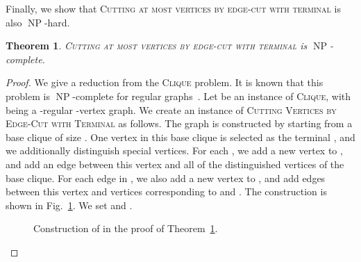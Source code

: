 \documentclass[a4paper,11pt]{article}
\newtheorem{theorem}{Theorem}
\theoremstyle{definition}
\theoremstyle{remark}
\DeclareMathOperator{\operatorClassNP}{NP}
\newcommand{\classNP}{\ensuremath{\operatorClassNP}}
\begin{document}
Finally, we show that \textsc{Cutting at most   vertices by edge-cut with terminal} is also \classNP-hard.

\begin{theorem}\label{thm:sec_terminal_np}
\textsc{Cutting at most   vertices by edge-cut with terminal} is \classNP-complete.
\end{theorem}

\begin{proof}
We give a reduction from the \textsc{Clique} problem. It is known that this problem is \classNP-complete for regular graphs~\cite{GareyJ79}. Let  be an instance of \textsc{Clique}, with  being a -regular -vertex graph. We create an instance  of \textsc{Cutting  Vertices by Edge-Cut with Terminal} as follows. The graph  is constructed by starting from a base clique of size . One vertex in this base clique is selected as the terminal , and we additionally distinguish  special vertices. For each , we add a new vertex to , and add an edge between this vertex and all of the  distinguished vertices of the base clique. For each edge  in , we also add a new vertex to , and add edges between this vertex and vertices corresponding to  and .
The construction is shown in Fig.~\ref{fig:NPc}.
We set  and .


\begin{figure}[ht]
\centering{}
\caption{Construction of  in the proof of Theorem~\ref{thm:sec_terminal_np}.
\label{fig:NPc}}
\end{figure}



\end{proof}
\end{document}
